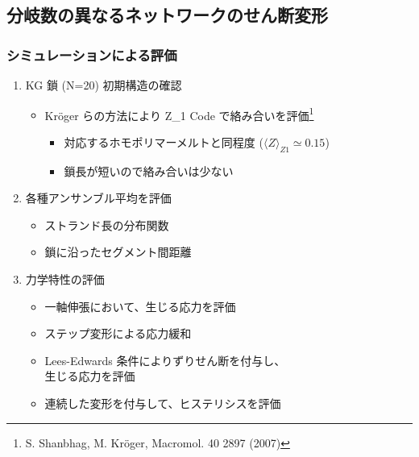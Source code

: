 \documentclass[12pt, dvipdfmx]{beamer}
\begin{document}
\subsection{分岐数の異なるネットワークのせん断変形}
\begin{frame}
	\frametitle{シミュレーションによる評価}
	\begin{enumerate}
		\item KG 鎖 (N=20) 初期構造の確認
			\begin{itemize}
				\item Kr\"{o}ger らの方法により Z\_1 Code で絡み合いを評価\footnote[1]{
					\scriptsize{S. Shanbhag, M. Kr\"{o}ger, Macromol. 40 2897 (2007)}
				}
				\begin{itemize}
					\item 対応するホモポリマーメルトと同程度 ($\langle Z \rangle_{Z1} \simeq 0.15$)
					\item 鎖長が短いので絡み合いは少ない
				\end{itemize}
			\end{itemize}
		\item 各種アンサンブル平均を評価
			\begin{itemize}
				\item ストランド長の分布関数
				\item 鎖に沿ったセグメント間距離
			\end{itemize}
		\item 力学特性の評価
			\begin{itemize}
				\item 一軸伸張において、生じる応力を評価
				\item ステップ変形による応力緩和
				\item \alert{Lees-Edwards 条件によりずりせん断}を付与し、\\生じる応力を評価
				\item 連続した変形を付与して、ヒステリシスを評価
			\end{itemize}	
	\end{enumerate}
\end{frame}
\end{document}
